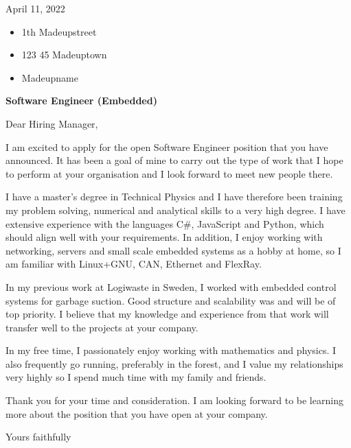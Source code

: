 April 11, 2022

\begin{itemize}
	\item 1th Madeupstreet
	\item 123 45 Madeuptown
	\item Madeupname
\end{itemize}

\bigskip

\textbf{Software Engineer (Embedded)}

Dear Hiring Manager,

I am excited to apply for the open Software Engineer position that you have announced. It has been a goal of mine to carry out the type of work that I hope to perform at your organisation and I look forward to meet new people there. 

I have a master's degree in Technical Physics and I have therefore been training my problem solving, numerical and analytical skills to a very high degree. I have extensive experience with the languages C\#, JavaScript and Python, which should align well with your requirements. In addition, I enjoy working with networking, servers and small scale embedded systems as a hobby at home, so I am familiar with Linux+GNU, CAN, Ethernet and FlexRay.

In my previous work at Logiwaste in Sweden, I worked with embedded control systems for garbage suction. Good structure and scalability was and will be of top priority. I believe that my knowledge and experience from that work will transfer well to the projects at your company.

In my free time, I passionately enjoy working with mathematics and physics. I also frequently go running, preferably in the forest, and I value my relationships very highly so I spend much time with my family and friends.

Thank you for your time and consideration. I am looking forward to be learning more about the position that you have open at your company.

Yours faithfully



































